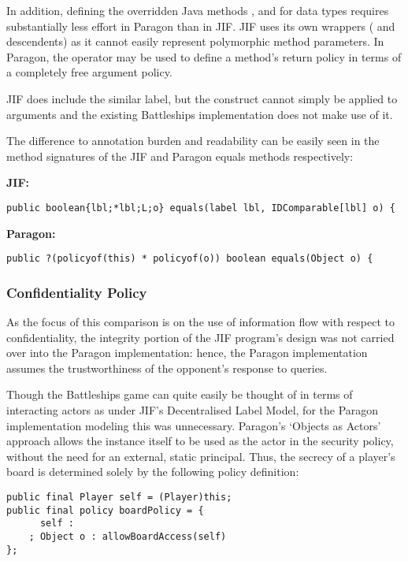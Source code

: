 In addition, defining the overridden Java methods ,  and  for data types requires substantially less effort in Paragon than in JIF. JIF uses its own wrappers ( and descendents) as it cannot easily represent polymorphic method parameters. In Paragon, the  operator may be used to define a method's return policy in terms of a completely free argument policy.

JIF does include the similar  label, but the construct cannot simply be applied to arguments and the existing Battleships implementation does not make use of it.

The difference to annotation burden and readability can be easily seen in the method signatures of the JIF and Paragon equals methods respectively:

\textbf{JIF:}

\begin{verbatim}
public boolean{lbl;*lbl;L;o} equals(label lbl, IDComparable[lbl] o) {
\end{verbatim}

\textbf{Paragon:}

\begin{verbatim}
public ?(policyof(this) * policyof(o)) boolean equals(Object o) {
\end{verbatim}

\subsubsection{Confidentiality Policy}

As the focus of this comparison is on the use of information flow with respect to confidentiality, the integrity portion of the JIF program's design was not carried over into the Paragon implementation: hence, the Paragon implementation assumes the trustworthiness of the opponent's response to queries.

Though the Battleships game can quite easily be thought of in terms of interacting actors as under JIF's Decentralised Label Model, for the Paragon implementation modeling this was unnecessary. Paragon's `Objects as Actors' approach allows the  instance itself to be used as the actor in the security policy, without the need for an external, static principal. Thus, the secrecy of a player's board is determined solely by the following policy definition:

\begin{verbatim}
public final Player self = (Player)this;
public final policy boardPolicy = {
	  self :
	; Object o : allowBoardAccess(self)
};
\end{verbatim}

